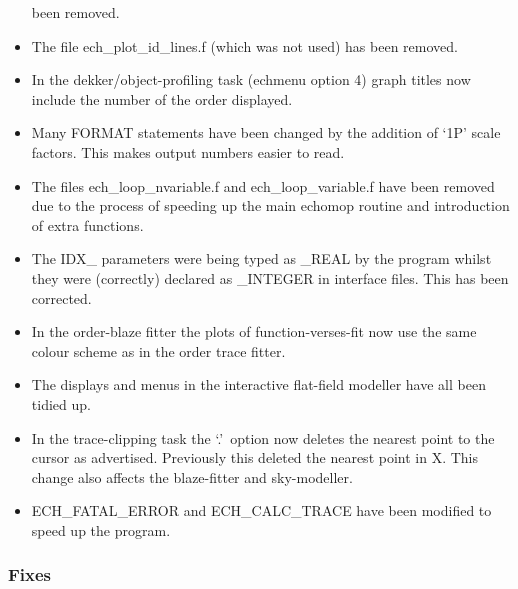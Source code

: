 \documentclass[11pt,twoside]{article}
\begin{document}
\begin{itemize}
   been removed.
\item The file ech\_plot\_id\_lines.f (which was not used) has been removed.
\item In the dekker/object-profiling task (echmenu option 4) graph titles
   now include the number of the order displayed.
\item Many FORMAT statements have been changed by the addition of `1P'
   scale factors.  This makes output numbers easier to read.
\item The files ech\_loop\_nvariable.f and ech\_loop\_variable.f have been
   removed due to the process of speeding up the main {\sc echomop} routine
   and introduction of extra functions.
\item The IDX\_ parameters were being typed as \_REAL by the program whilst
   they were (correctly) declared as \_INTEGER in interface files.
   This has been corrected.
\item In the order-blaze fitter the plots of function-verses-fit now
   use the same colour scheme as in the order trace fitter.
\item The displays and menus in the interactive flat-field modeller have
   all been tidied up.
\item In the trace-clipping task the `.'\ option now deletes the nearest
   point to the cursor as advertised.  Previously this deleted the
   nearest point in X.  This change also affects the blaze-fitter and
   sky-modeller.
\item ECH\_FATAL\_ERROR and ECH\_CALC\_TRACE have been modified to speed up
   the program.
\end{itemize}

\subsubsection{Fixes}
\end{document}
